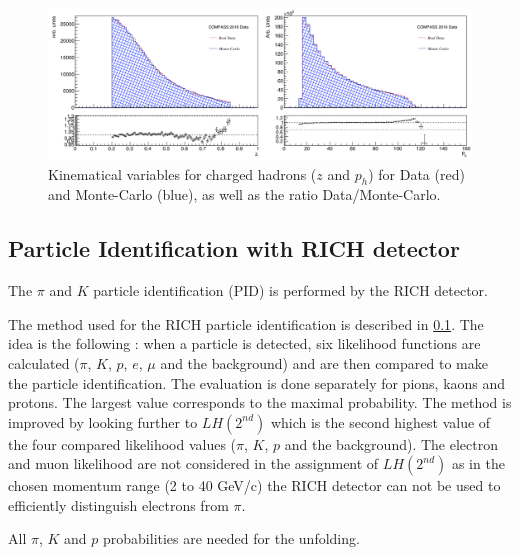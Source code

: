 \documentclass[letterpaper,12pt]{article}
\begin{document}
\newpage

\hspace*{0mm}\vfill
\begin{figure}[!h]
	\includegraphics[scale=0.5]{./gfx/SIDIS_kin.png}
	\caption{Kinematical variables for charged hadrons ($z$ and $p_h$) for Data (red) and Monte-Carlo (blue), as well as the ratio Data/Monte-Carlo.}
	\label{SIDISkin}
\end{figure}
\vfill\hspace*{0mm}

\newpage

\subsection{Particle Identification with RICH detector}

The $\pi$ and $K$ particle identification (PID) is performed by the RICH detector.

The method used for the RICH particle identification is described in \ref{}. The idea is the following : when a particle
is detected, six likelihood functions are calculated ($\pi$, $K$, $p$, $e$, $\mu$ and the background) and are then
compared to make the particle identification. The evaluation is done separately for pions, kaons and protons. The largest
value corresponds to the maximal probability. The method is improved by looking further to $LH(2^{nd})$ which is the second
highest value of the four compared likelihood values ($\pi$, $K$, $p$ and the background). The electron and muon likelihood
are not considered in the assignment of $LH(2^{nd})$ as in the chosen momentum range (2 to 40 GeV/c) the RICH detector can
not be used to efficiently distinguish electrons from $\pi$.

All $\pi$, $K$ and $p$ probabilities are needed for the unfolding.
\end{document}
